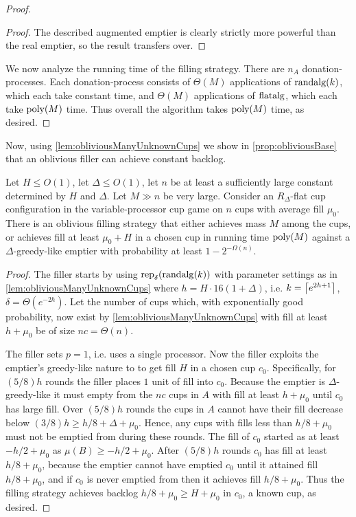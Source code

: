 \begin{proof}
\begin{proof}
  The described augmented emptier is clearly strictly more
  powerful than the real emptier, so the result transfers over.
\end{proof}

We now analyze the running time of the filling strategy.
There are $n_A$ donation-processes. Each donation-process
consists of $\Theta(M)$ applications of $\operatorname{\text{\textup{randalg}}}(k)$, which each take
constant time, and $\Theta(M)$
applications of $\operatorname{\text{\textup{flatalg}}}$, which each take $\operatorname{\text{poly}}(M)$ time.
Thus overall the algorithm takes $\operatorname{\text{poly}}(M)$ time, as desired.
  
\end{proof}

Now, using \cref{lem:obliviousManyUnknownCups} we show in
\cref{prop:obliviousBase} that an oblivious filler can achieve
constant backlog. 
\begin{proposition}
  \label{prop:obliviousBase}
  Let $H \le O(1)$, let $\Delta \le O(1)$, let $n$ be at
  least a sufficiently large constant determined by $H$ and
  $\Delta$. 
  Let $M \gg n$ be very large.
  Consider an $R_\Delta$-flat cup configuration in the variable-processor cup
  game on $n$ cups with average fill $\mu_0$.
  There is an oblivious filling strategy that either
  achieves mass $M$ among the cups, or achieves fill at least $\mu_0 + H$
  in a chosen cup in running time $\operatorname{\text{poly}}(M)$ against a
  $\Delta$-greedy-like emptier with probability at least $1-2^{-\Omega(n)}.$
\end{proposition}
\begin{proof}
  The filler starts by using $\operatorname{\text{\textup{rep}}}_\delta(\operatorname{\text{\textup{randalg}}}(k))$ with
  parameter settings as in \cref{lem:obliviousManyUnknownCups}
  where $h = H\cdot 16(1+\Delta)$, i.e. $k = \left\lceil e^{2h+1} \right\rceil$,
  $\delta = \Theta(e^{-2h})$. 
  Let the number of cups which, with exponentially good
  probability, now exist by
  \cref{lem:obliviousManyUnknownCups} with
  fill at least $h+\mu_0$ be of size $nc = \Theta(n)$.

  The filler sets $p=1$, i.e. uses a single processor. Now the
  filler exploits the emptier's greedy-like nature to to get fill
  $H$ in a chosen cup $c_0$. Specifically, for $(5/8)h$ rounds
  the filler places $1$ unit of fill into $c_0$. Because the
  emptier is $\Delta$-greedy-like it must empty from the $nc$
  cups in $A$ with fill at least $h+\mu_0$ until $c_0$ has large
  fill. Over $(5/8)h$ rounds the cups in $A$ cannot have their
  fill decrease below $(3/8)h \ge h/8 + \Delta + \mu_0$. Hence,
  any cups with fills less than $h/8+\mu_0$ must not be emptied
  from during these rounds. The fill of $c_0$ started as at least
  $-h/2+\mu_0$ as $\mu(B) \ge -h/2+\mu_0$. After $(5/8)h$ rounds
  $c_0$ has fill at least $h/8+\mu_0$, because the emptier cannot
  have emptied $c_0$ until it attained fill $h/8+\mu_0$, and if
  $c_0$ is never emptied from then it achieves fill $h/8+\mu_0$.
  Thus the filling strategy achieves backlog $h/8 +\mu_0 \ge H +
  \mu_0$ in $c_0$, a known cup, as desired.

\end{proof}

